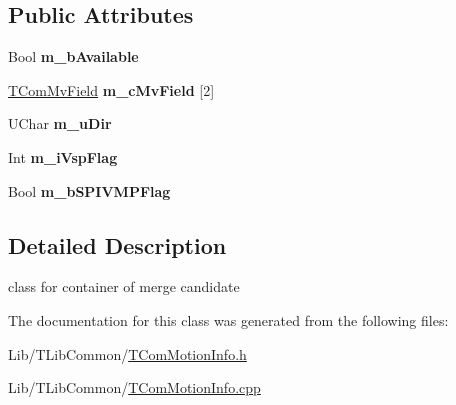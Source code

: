 \subsection*{Public Attributes}
\begin{DoxyCompactItemize}
\item 
\mbox{\label{class_t_com_motion_cand_aec5db434aac7f5c9c44a3a8ba7da4c1c}} 
Bool {\bfseries m\+\_\+b\+Available}
\item 
\mbox{\label{class_t_com_motion_cand_a6547391ab8774b6ccd4811ed77bf27ff}} 
\hyperlink{class_t_com_mv_field}{T\+Com\+Mv\+Field} {\bfseries m\+\_\+c\+Mv\+Field} \mbox{[}2\mbox{]}
\item 
\mbox{\label{class_t_com_motion_cand_a5a46143def307799a21a4e73f4df8882}} 
U\+Char {\bfseries m\+\_\+u\+Dir}
\item 
\mbox{\label{class_t_com_motion_cand_ad8b1f42cdaf67e88ecff110e8ffb07eb}} 
Int {\bfseries m\+\_\+i\+Vsp\+Flag}
\item 
\mbox{\label{class_t_com_motion_cand_a6147afb1b34c0b5407414f2eab21a4c0}} 
Bool {\bfseries m\+\_\+b\+S\+P\+I\+V\+M\+P\+Flag}
\end{DoxyCompactItemize}


\subsection{Detailed Description}
class for container of merge candidate 

The documentation for this class was generated from the following files\+:\begin{DoxyCompactItemize}
\item 
Lib/\+T\+Lib\+Common/\hyperlink{_t_com_motion_info_8h}{T\+Com\+Motion\+Info.\+h}\item 
Lib/\+T\+Lib\+Common/\hyperlink{_t_com_motion_info_8cpp}{T\+Com\+Motion\+Info.\+cpp}\end{DoxyCompactItemize}
